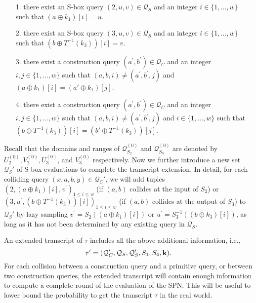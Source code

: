 \begin{itemize}
	\item[1.]
	there exist an S-box query $(2, u, v) \in \mathcal{Q}_{S}$ and an integer $i \in\{1, \ldots, w\}$ such that $\left(a \oplus k_1\right)[i]=u$.
	\item[2.]
	there exist an S-box query $(3, u, v) \in \mathcal{Q}_{S}$ and an integer $i \in\{1, \ldots, w\}$ such that $\left(b \oplus T^{-1}(k_3)\right)[i]=v$.
	\item[3.] there exist a construction query $\left(a^{\prime}, b^{\prime}\right) \in \mathcal{Q}_{C}$ and an integer $i,j \in\{1, \ldots, w\}$ such that $(a, b, i) \neq\left(a^{\prime}, b^{\prime}, j\right)$ and $\left(a \oplus k_1\right)[i] = \left(a' \oplus k_1\right)[j]$.
	\item[4.] there exist a construction query $\left(a^{\prime}, b^{\prime}\right) \in \mathcal{Q}_{C}$ and an integer $i,j \in\{1, \ldots, w\}$ such that $(a, b, i) \neq\left(a^{\prime}, b^{\prime}, j\right)$ and $i \in\{1, \ldots, w\}$ such that $\left(b \oplus T^{-1}(k_3)\right)[i] = \left(b' \oplus T^{-1}(k_3)\right)[j]$.
\end{itemize}
%
%
Recall that the domains and ranges of $\mathcal{Q}_{S_{2}}^{(0)}$ and $\mathcal{Q}_{S_{3}}^{(0)}$ are denoted by $U_{2}^{(0)},V_{2}^{(0)},U_{3}^{(0)}$, and $V_{3}^{(0)}$ respectively. Now we further introduce a new set $\mathcal{Q}_{S}'$ of S-box evaluations to complete the transcript extension. In detail, for each colliding query $(x,a,b,y)\in\mathcal{Q}_C'$, we will add tuples $\left(2, (a \oplus k_1)[i], v^{\prime}\right)_{1 \leq i \leq w}$ (if $(a, b)$ collides at the input of $S_2$) or $\left(3, u^{\prime}, (b \oplus T^{-1}(k_3))[i]\right)_{1 \leq i \leq w}$ (if $(a, b)$ collides at the output of $S_3$) to $\mathcal{Q}_{S}'$ by lazy sampling $v^{\prime}=S_2(\left(a \oplus k_1\right)[i])$ or $u^{\prime}=S_3^{-1}(\left(b \oplus k_3\right)[i])$, as long as it has not been determined by any existing query in $\mathcal{Q}_S$.


An extended transcript of $\tau$ includes all the above additional information, i.e.,
%
$$\tau'=(\mathcal{Q}_{C}',\mathcal{Q}_{S},\mathcal{Q}_{S}',S_1,S_4,\mathbf{k}).$$
%
For each collision between a construction query and a primitive query, or between two construction queries, the extended transcript will contain enough information to compute a complete round of the evaluation of the SPN. This will be useful to lower bound the probability to get the transcript $\tau$ in the real world.


